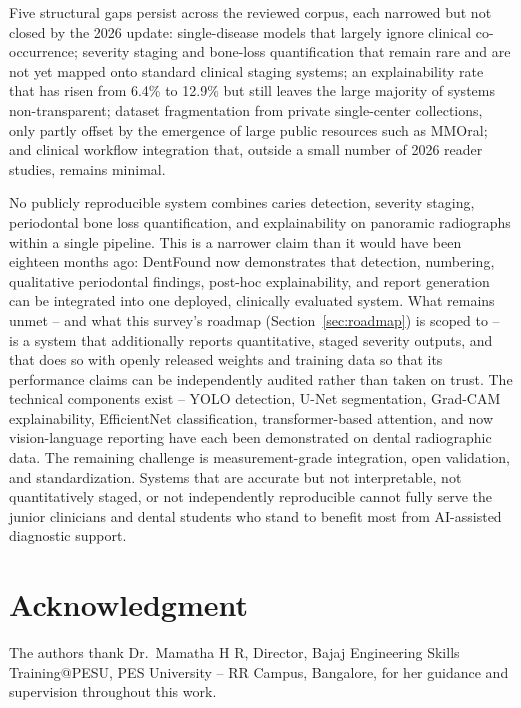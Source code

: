 \documentclass[conference]{IEEEtran}
\begin{document}
Five structural gaps persist across the reviewed corpus, each narrowed
but not closed by the 2026 update: single-disease models that largely
ignore clinical co-occurrence; severity staging and bone-loss
quantification that remain rare and are not yet mapped onto standard
clinical staging systems; an explainability rate that has risen from
6.4\% to 12.9\% but still leaves the large majority of systems
non-transparent; dataset fragmentation from private single-center
collections, only partly offset by the emergence of large public
resources such as MMOral; and clinical workflow integration that,
outside a small number of 2026 reader studies, remains minimal.

No publicly reproducible system combines caries detection, severity
staging, periodontal bone loss quantification, and explainability on
panoramic radiographs within a single pipeline. This is a narrower
claim than it would have been eighteen months ago: DentFound
\cite{zhu2026dentfound} now demonstrates that detection, numbering,
qualitative periodontal findings, post-hoc explainability, and
report generation can be integrated into one deployed, clinically
evaluated system. What remains unmet -- and what this survey's
roadmap (Section~\ref{sec:roadmap}) is scoped to -- is a system that
additionally reports quantitative, staged severity outputs, and that
does so with openly released weights and training data so that its
performance claims can be independently audited rather than taken on
trust. The technical components exist -- YOLO detection, U-Net
segmentation, Grad-CAM explainability, EfficientNet classification,
transformer-based attention, and now vision-language reporting have
each been demonstrated on dental radiographic data. The remaining
challenge is measurement-grade integration, open validation, and
standardization. Systems that are accurate but not interpretable, not
quantitatively staged, or not independently reproducible cannot fully
serve the junior clinicians and dental students who stand to benefit
most from AI-assisted diagnostic support.

\section*{Acknowledgment}
The authors thank Dr.\ Mamatha H R, Director, Bajaj Engineering Skills
Training@PESU, PES University -- RR Campus, Bangalore, for her guidance
and supervision throughout this work.



\end{document}
